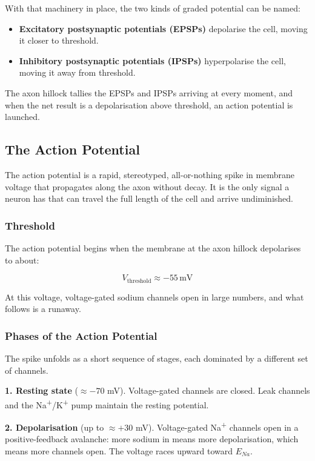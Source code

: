 \documentclass[11pt]{article}
\begin{document}
With that machinery in place, the two kinds of graded potential can be named:

\begin{itemize}
    \item \textbf{Excitatory postsynaptic potentials (EPSPs)} depolarise the cell, moving it closer to threshold.
    \item \textbf{Inhibitory postsynaptic potentials (IPSPs)} hyperpolarise the cell, moving it away from threshold.
\end{itemize}

The axon hillock tallies the EPSPs and IPSPs arriving at every moment, and when the net result is a depolarisation above threshold, an action potential is launched.

\subsection{The Action Potential}

The action potential is a rapid, stereotyped, all-or-nothing spike in membrane voltage that propagates along the axon without decay. It is the only signal a neuron has that can travel the full length of the cell and arrive undiminished.

\subsubsection{Threshold}

The action potential begins when the membrane at the axon hillock depolarises to about:

\[
V_{\text{threshold}} \approx -55 \, \text{mV}
\]

At this voltage, voltage-gated sodium channels open in large numbers, and what follows is a runaway.

\subsubsection{Phases of the Action Potential}

The spike unfolds as a short sequence of stages, each dominated by a different set of channels.

\textbf{1. Resting state} ($\approx -70$ mV). Voltage-gated channels are closed. Leak channels and the Na\textsuperscript{+}/K\textsuperscript{+} pump maintain the resting potential.

\textbf{2. Depolarisation} (up to $\approx +30$ mV). Voltage-gated Na\textsuperscript{+} channels open in a positive-feedback avalanche: more sodium in means more depolarisation, which means more channels open. The voltage races upward toward $E_{Na}$.
\end{document}
